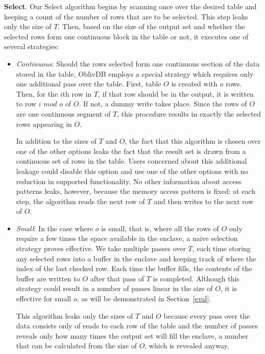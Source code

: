 \documentclass[letterpaper,twocolumn,10pt]{article}
\def\name/{OblivDB}
\begin{document}
  \noindent \textbf{Select}. 
Our Select algorithm begins by scanning once over the desired table and keeping a count of the number of rows that are to be selected. This step leaks only the size of $T$. Then, based on the size of the output set and whether the selected rows form one continuous block in the table or not, it executes one of several strategies:
\begin{itemize}[itemsep=0pt,parsep=0pt]
\item \textit{Continuous}: Should the rows selected form one continuous section of the data stored in the table, \name/ employs a special strategy which requires only one additional pass over the table. First, table $O$ is created with $o$ rows. Then, for the $i$th row in $T$, if that row should be in the output, it is written to row $i\textit{ mod }o$ of $O$. If not, a dummy write takes place. Since the rows of $O$ are one continuous segment of $T$, this procedure results in exactly the selected rows appearing in $O$. 

In addition to the sizes of $T$ and $O$, the fact that this algorithm is chosen over one of the other options leaks the fact that the result set is drawn from a continuous set of rows in the table. Users concerned about this additional leakage could disable this option and use one of the other options with no reduction in supported functionality. No other information about access patterns leaks, however, because the memory access pattern is fixed: at each step, the algorithm reads the next row of $T$ and then writes to the next row of $O$. 

\item \textit{Small}: In the case where $o$ is small, that is, where all the rows of $O$ only require a few times the space available in the enclave, a naive selection strategy proves effective. We take multiple passes over $T$, each time storing any selected rows into a buffer in the enclave and keeping track of where the index of the last checked row. Each time the buffer fills, the contents of the buffer are written to $O$ after that pass of $T$ is completed. Although this strategy could result in a number of passes linear in the size of $O$, it is effective for small $o$, as will be demonstrated in Section~\ref{eval}.

This algorithm leaks only the sizes of $T$ and $O$ because every pass over the data consists only of reads to each row of the table and the number of passes reveals only how many times the output set will fill the enclave, a number that can be calculated from the size of $O$, which is revealed anyway. 


\end{itemize}
\end{document}
